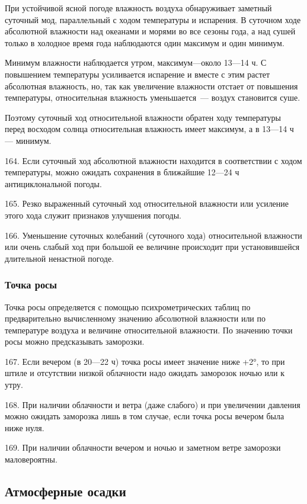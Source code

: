 При устойчивой ясной погоде влажность воздуха обнаруживает заметный суточный мод, параллельный с ходом температуры и испарения. В суточном ходе абсолютной влажности над океанами и морями во все сезоны года, а над сушей только в холодное время года наблюдаются один максимум и один минимум.

Минимум влажности наблюдается утром, максимум—около 13—14 ч. С повышением температуры усиливается испарение и вместе с этим растет абсолютная влажность, но, так как увеличение влажности отстает от повышения температуры, относительная влажность уменьшается~--- воздух становится суше.

Поэтому суточный ход относительной влажности обратен ходу температуры перед восходом солнца относительная влажность имеет максимум, а в 13—14 ч — минимум.

164. Если суточный ход абсолютной влажности находится в соответствии с ходом температуры, можно ожидать сохранения в ближайшие 12—24 ч антициклональной погоды.

165. Резко выраженный суточный ход относительной влажности или усиление этого хода служит признаков улучшения погоды.

166. Уменьшение суточных колебаний (суточного хода) относительной влажности или очень слабый ход при большой ее величине происходит при установившейся длительной ненастной погоде.

\subsubsection{Точка росы}

Точка росы определяется с помощью психрометрических таблиц по предварительно вычисленному значению абсолютной влажности или по температуре воздуха и величине относительной влажности. По значению точки росы можно предсказывать заморозки.

167. Если вечером (в 20—22 ч) точка росы имеет значение ниже +2°, то при штиле и отсутствии низкой облачности надо ожидать заморозок ночью или к утру.

168. При наличии облачности и ветра (даже слабого) и при увеличении давления можно ожидать заморозка лишь в том случае, если точка росы вечером была ниже нуля.

169. При наличии облачности вечером и ночью и заметном ветре заморозки маловероятны.

\subsection{Атмосферные осадки}

